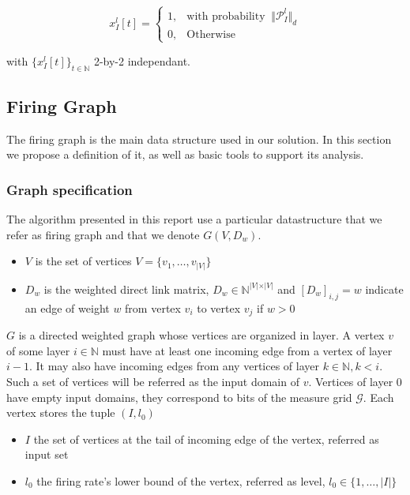\documentclass[a4paper, 11pt]{article}
\begin{document}
\begin{equation*}
x_I^l[t] = \begin{cases} 1, & \text{with probability }\ \Vert \mathcal{P}_I^l \Vert_{d} \\ 0, & \text{Otherwise} \end{cases}
\end{equation*}

with $\{ x_I^l[t] \}_{t\in \mathbb{N}}$ 2-by-2 independant.

\subsection{Firing Graph}
The firing graph is the main data structure used in our solution. In this section we propose a definition of it, as well as basic tools to support its analysis.
  
\subsubsection*{Graph specification}
The algorithm presented in this report use a particular datastructure that we refer as firing graph and that we denote $G(V, D_w)$. 

\begin{itemize}
\item $V$ is the set of vertices $V = \lbrace v_1, \ldots, v_{\vert V \vert} \rbrace$
\item $D_w$ is the weighted direct link matrix, $D_w \in \mathbb{N}^{\vert V \vert \times \vert V \vert}$ and $\left[ D_w \right]_{i, j} = w$ indicate an edge of weight $w$ from vertex $v_i$ to vertex $v_j$ if $w > 0$  
\end{itemize}

$G$ is a directed weighted graph whose vertices are organized in layer. A vertex $v$ of some layer $i \in \mathbb{N}$ must have at least one incoming edge from a vertex of layer $i-1$. It may also have incoming edges from any vertices of layer $k \in \mathbb{N}, k < i$. Such a set of vertices will be referred as the input domain of $v$. Vertices of layer $0$ have empty input domains, they correspond to bits of the measure grid $\mathcal{G}$. Each vertex stores the tuple $(I, l_0)$

\begin{itemize}
\item $I$ the set of vertices at the tail of incoming edge of the vertex, referred as input set
\item $l_0$ the firing rate's lower bound of the vertex, referred as level, $l_0 \in \lbrace 1, \ldots, \vert I \vert \rbrace$ 
\end{itemize}
\end{document}
